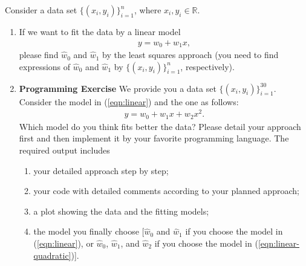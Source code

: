 \documentclass[11pt,letter,notitlepage]{article}
\begin{document}
\newpage


\begin{exercise}
	Consider a data set $\{ (x_i ,y_i) \}_{i=1}^{n}$, where $x_i,y_i\in \mathbb{R}$. 
	\begin{enumerate}
	    \item If we want to fit the data by a linear model
	        \begin{align}\label{eqn:linear}
	            y =  w_0 + w_1 x,
	        \end{align}
	        please find $\hat{w}_0$ and $\hat{w}_1$ by the least squares approach (you need to find expressions of $\hat{w}_0$ and $\hat{w}_1$ by $\{ (x_i ,y_i) \}_{i=1}^{n}$, respectively).
	    \item \textbf{Programming Exercise} We provide you a data set $\{ (x_i ,y_i) \}_{i=1}^{30}$. Consider the model in (\ref{eqn:linear}) and the one as follows:
	        \begin{align}\label{eqn:linear-quadratic}
	            y =  w_0 + w_1 x+ w_2 x^2. 
	        \end{align}
	        Which model do you think fits better the data? Please detail your approach first and then implement it by your favorite programming language. The required output includes 
	        \begin{enumerate}
	            \item your detailed approach step by step; 
	            \item your code with detailed comments according to your planned approach; 
	            \item a plot showing the data and the fitting models; 
	            \item the model you finally choose [$\hat{w}_0$ and $\hat{w}_1$ if you choose the model in (\ref{eqn:linear}), or $\hat{w}_0$, $\hat{w}_1$, and $\hat{w}_2$ if you choose the model in (\ref{eqn:linear-quadratic})].
	        \end{enumerate}
	\end{enumerate}

\end{exercise}
\end{document}
